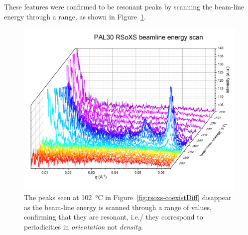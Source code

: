 These features were confirmed to be resonant peaks by scanning the beam-line
energy through a range, as shown in Figure~\ref{fig:resonant-energy-scan}.
\begin{figure}[h!]
    \centering
    \includegraphics[width=.8\textwidth]{./figs/pal30/finalFigs/resonsnat-energy-scan.png}
    \caption{\label{fig:resonant-energy-scan} The peaks seen at
        \SI{102}{\degreeCelsius} in Figure~\ref{fig:rsoxs-coexistDiff} disappear
        as the beam-line energy is scanned through a range of values, confirming
        that they are resonant, i.e./ they correspond to periodicities in
    \textit{orientation} not \textit{density}.}
\end{figure}

